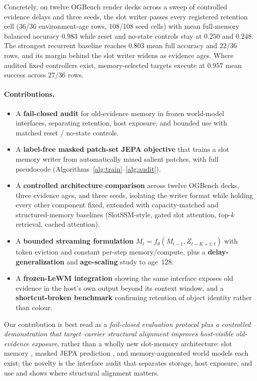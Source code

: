 Concretely, on twelve OGBench render decks across a sweep of controlled
evidence delays and three seeds, the slot writer passes every registered
retention cell (36/36 environment-age rows, 108/108 seed cells) with mean
full-memory balanced accuracy $0.983$ while reset and no-state controls stay at
$0.250$ and $0.248$.  The strongest recurrent baseline reaches $0.803$ mean full
accuracy and $22/36$ rows, and its margin behind the slot writer widens as
evidence ages.  Where audited fixed controllers exist, memory-selected targets
execute at $0.957$ mean success across $27/36$ rows.

\paragraph{Contributions.}
\begin{itemize}
  \setlength\itemsep{1pt}
  \item A \textbf{fail-closed audit} for old-evidence memory in frozen
    world-model interfaces, separating retention, host exposure, and bounded
    use with matched reset / no-state controls.
  \item A \textbf{label-free masked patch-set JEPA objective} that trains a slot
    memory writer from automatically mined salient patches, with full pseudocode
    (Algorithms~\ref{alg:train}--\ref{alg:audit}).
  \item A \textbf{controlled architecture comparison} across twelve OGBench
    decks, three evidence ages, and three seeds, isolating the writer format
    while holding every other component fixed, extended with capacity-matched
    and structured-memory baselines (SlotSSM-style, gated slot attention,
    top-$k$ retrieval, cached attention).
  \item A \textbf{bounded streaming formulation} $M_t=f_\theta(M_{t-1},
    Z_{t-K+1:t})$ with token eviction and constant per-step memory/compute, plus
    a \textbf{delay-generalization} and \textbf{age-scaling} study to age~128.
  \item A \textbf{frozen-LeWM integration} showing the same interface exposes
    old evidence in the host's own output beyond its context window, and a
    \textbf{shortcut-broken benchmark} confirming retention of object identity
    rather than colour.
\end{itemize}

\noindent
Our contribution is best read as a \emph{fail-closed evaluation protocol plus a
controlled demonstration that target--carrier structural alignment improves
host-visible old-evidence exposure}, rather than a wholly new slot-memory
architecture: slot memory \citep{r_slotssm,r_gsa,r_slotmemory}, masked JEPA
prediction \citep{r_causaljepa}, and memory-augmented world models
\citep{r_onmemory,r_lewm} each exist; the novelty is the interface audit that
separates storage, host exposure, and use and shows where structural alignment
matters.

